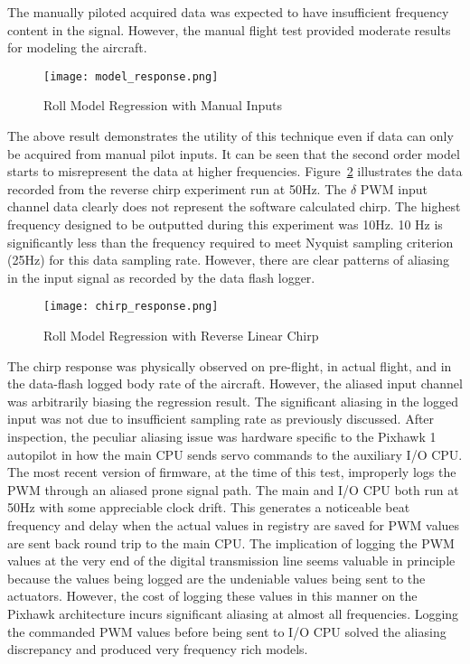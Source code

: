 The manually piloted acquired data was expected to have insufficient frequency content in the signal.  However, the manual flight test provided moderate results for modeling the aircraft.

\begin{figure}[!h]
 \centering
  \texttt{[image: model\_response.png]}
  \caption{Roll Model Regression with Manual Inputs}
  \label{fig:roll_model}
\end{figure}

The above result demonstrates the utility of this technique even if data can only be acquired from manual pilot inputs.  It can be seen that the second order model starts to misrepresent the data at higher frequencies.  Figure~\ref{fig:chirp_model} illustrates the data recorded from the reverse chirp experiment run at 50Hz.  The $\delta$ \ac{PWM} input channel data clearly does not represent the software calculated chirp.  The highest frequency designed to be outputted during this experiment was 10Hz.  10 Hz is significantly less than the frequency required to meet Nyquist sampling criterion (25Hz)  for this data sampling rate.  However, there are clear patterns of aliasing in the input signal as recorded by the data flash logger.  

\begin{figure}[!h]
 \centering
  \texttt{[image: chirp\_response.png]}
  \caption{Roll Model Regression with Reverse Linear Chirp}
  \label{fig:chirp_model}
\end{figure}

The chirp response was physically observed on pre-flight, in actual flight, and in the data-flash logged body rate of the aircraft.  However, the aliased input channel was arbitrarily biasing the regression result.  The significant aliasing in the logged input was not due to insufficient sampling rate as previously discussed.  After inspection,  the peculiar aliasing issue was hardware specific to the Pixhawk 1 autopilot in how the main CPU sends servo commands to the auxiliary I/O  CPU.  The most recent version of firmware, at the time of this test, improperly logs the \ac{PWM} through an aliased prone signal path.  The main and I/O CPU both run at 50Hz with some appreciable clock drift.  This generates a noticeable beat frequency and delay when the actual values in registry are saved for \ac{PWM} values are sent back round trip to the main CPU.  The implication of logging the \ac{PWM} values at the very end of the digital transmission line seems valuable in principle because the values being logged are the undeniable values being sent to the actuators.  However, the cost of logging these values in this manner on the Pixhawk architecture incurs significant aliasing at almost all frequencies.  Logging the commanded \ac{PWM} values before being sent to I/O CPU solved the aliasing discrepancy and produced very frequency rich models.

